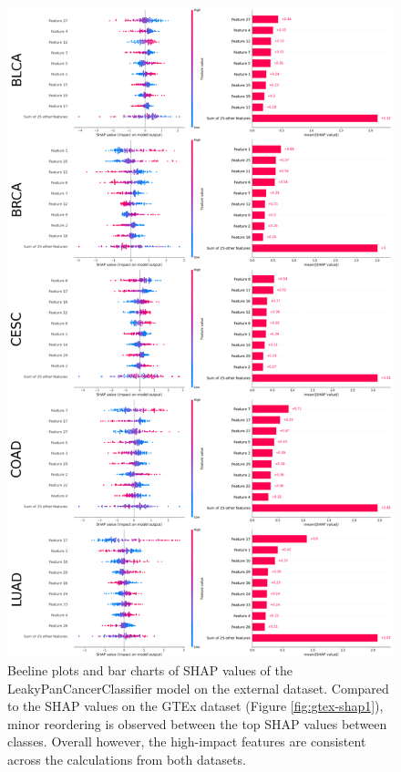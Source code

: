 \documentclass{l4proj}
\begin{document}
\begin{appendices}
\begin{figure}
    \centering
    \includegraphics[width=0.85\linewidth]{images/ext_shap1.png}
    \caption{Beeline plots and bar charts of SHAP values of the LeakyPanCancerClassifier model on the external dataset. Compared to the SHAP values on the GTEx dataset (Figure \ref{fig:gtex-shap1}), minor reordering is observed between the top SHAP values between classes. Overall however, the high-impact features are consistent across the calculations from both datasets.}
    \label{fig:ext-shap1}
\end{figure}


\end{appendices}
\end{document}
